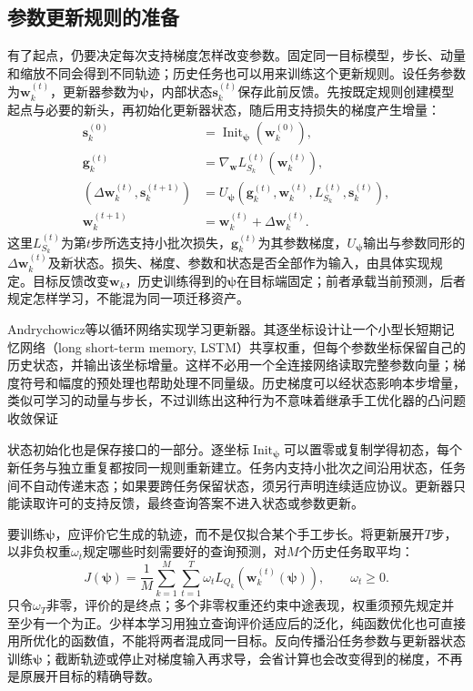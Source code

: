 \subsection{参数更新规则的准备}
\label{sec:ket-transfer-learned-optimizer}

有了起点，仍要决定每次支持梯度怎样改变参数。固定同一目标模型，步长、动量和缩放不同会得到不同轨迹；历史任务也可以用来训练这个更新规则。设任务参数为$\bm w_k^{(t)}$，更新器参数为$\bm\psi$，内部状态$\bm s_k^{(t)}$保存此前反馈。先按既定规则创建模型起点与必要的新头，再初始化更新器状态，随后用支持损失的梯度产生增量：
\begin{align}
  \bm s_k^{(0)}
    &=\operatorname{Init}_{\bm\psi}(\bm w_k^{(0)}), \nonumber\\
  \bm g_k^{(t)}
    &=\nabla_{\bm w}L_{S_k}^{(t)}(\bm w_k^{(t)}), \nonumber\\
  (\Delta\bm w_k^{(t)},\bm s_k^{(t+1)})
    &=U_{\bm\psi}(\bm g_k^{(t)},\bm w_k^{(t)},
             L_{S_k}^{(t)},\bm s_k^{(t)}), \nonumber\\
  \bm w_k^{(t+1)}
    &=\bm w_k^{(t)}+\Delta\bm w_k^{(t)}.
  \label{eq:ket-transfer-learned-update}
\end{align}
这里$L_{S_k}^{(t)}$为第$t$步所选支持小批次损失，$\bm g_k^{(t)}$为其参数梯度，$U_{\bm\psi}$输出与参数同形的$\Delta\bm w_k^{(t)}$及新状态。损失、梯度、参数和状态是否全部作为输入，由具体实现规定。目标反馈改变$\bm w_k$，历史训练得到的$\bm\psi$在目标端固定；前者承载当前预测，后者规定怎样学习，不能混为同一项迁移资产。

Andrychowicz等以循环网络实现学习更新器。其逐坐标设计让一个小型长短期记忆网络（long short-term memory, LSTM）共享权重，但每个参数坐标保留自己的历史状态，并输出该坐标增量。这样不必用一个全连接网络读取完整参数向量；梯度符号和幅度的预处理也帮助处理不同量级。历史梯度可以经状态影响本步增量，类似可学习的动量与步长，不过训练出这种行为不意味着继承手工优化器的凸问题收敛保证

状态初始化也是保存接口的一部分。逐坐标$\operatorname{Init}_{\bm\psi}$可以置零或复制学得初态，每个新任务与独立重复都按同一规则重新建立。任务内支持小批次之间沿用状态，任务间不自动传递末态；如果要跨任务保留状态，须另行声明连续适应协议。更新器只能读取许可的支持反馈，最终查询答案不进入状态或参数更新。

要训练$\bm\psi$，应评价它生成的轨迹，而不是仅拟合某个手工步长。将更新展开$T$步，以非负权重$\omega_t$规定哪些时刻需要好的查询预测，对$M$个历史任务取平均：
\begin{equation}
  J(\bm\psi)=\frac1M\sum_{k=1}^{M}
       \sum_{t=1}^{T}\omega_t L_{Q_k}(\bm w_k^{(t)}(\bm\psi)),
       \qquad \omega_t\geq0.
  \label{eq:ket-transfer-optimizer-objective}
\end{equation}
只令$\omega_T$非零，评价的是终点；多个非零权重还约束中途表现，权重须预先规定并至少有一个为正。少样本学习用独立查询评价适应后的泛化，纯函数优化也可直接用所优化的函数值，不能将两者混成同一目标。反向传播沿任务参数与更新器状态训练$\bm\psi$；截断轨迹或停止对梯度输入再求导，会省计算也会改变得到的梯度，不再是原展开目标的精确导数。

